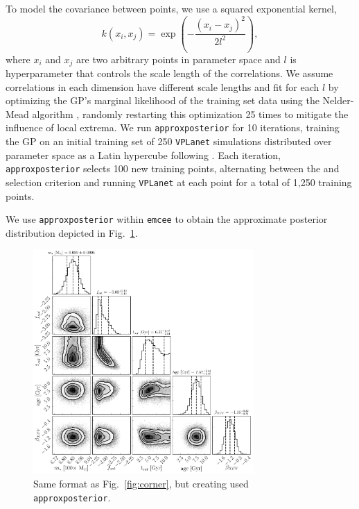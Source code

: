 \documentclass[twocolumn]{aastex62}
\newcommand{\vplanet}[0]{\texttt{VPLanet}\xspace}
\newcommand{\emcee}[0]{\texttt{emcee}\xspace}
\newcommand{\approxposterior}[0]{\texttt{approxposterior}\xspace}
\begin{document}
To model the covariance between points, we use a squared exponential kernel,
\begin{equation} \label{eqn:kernel}
k(x_i, x_j) = \exp \left( - \frac{(x_i - x_j)^2}{2l^2} \right),
\end{equation}
where $x_i$ and $x_j$ are two arbitrary points in parameter space and $l$ is hyperparameter that controls the scale length of the correlations. We assume correlations in each dimension have different scale lengths and fit for each $l$ by optimizing the GP's marginal likelihood of the training set data using the Nelder-Mead algorithm \citep{Nelder1965}, randomly restarting this optimization 25 times to mitigate the influence of local extrema. We run \approxposterior for 10 iterations, training the GP on an initial training set of 250 \vplanet simulations distributed over parameter space as a Latin hypercube following \citet{Bird2019}. Each iteration, \approxposterior selects 100 new training points, alternating between the \citet{Kandasamy2015} and \citet{Wang2017} selection criterion and running \vplanet at each point for a total of 1,250 training points. 

We use \approxposterior within \emcee to obtain the approximate posterior distribution depicted in Fig.~\ref{fig:approx}.

\begin{figure}[t]
\centering
	\includegraphics[width=0.75\textwidth]{../Analysis/Approx/apCorner.pdf}
   \caption{Same format as Fig.~\ref{fig:corner}, but creating used \approxposterior.}%
    \label{fig:approx}%
\end{figure}
\end{document}
